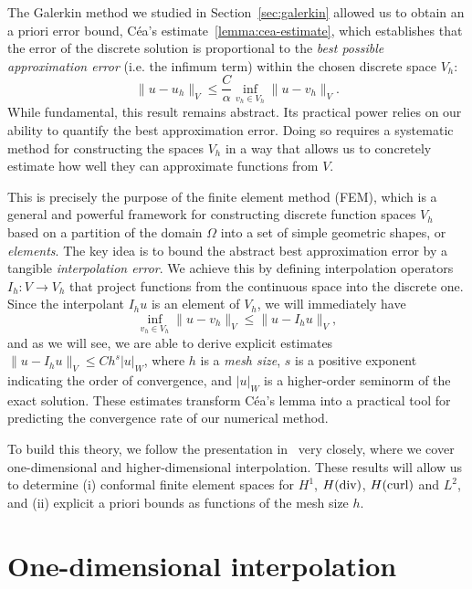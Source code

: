 The Galerkin method we studied in Section~\ref{sec:galerkin} allowed us to obtain an a priori error bound, Céa's estimate~\eqref{lemma:cea-estimate}, which establishes that the error of the discrete solution is proportional to the \emph{best possible approximation error} (i.e. the infimum term) within the chosen discrete space $V_h$:
\begin{equation}\label{eq:cea-estimate-fem}
    \|u-u_h\|_V \leq \frac{C}{\alpha} \inf_{v_h\in V_h} \| u - v_h\|_V.
\end{equation}
While fundamental, this result remains abstract. Its practical power relies on our ability to quantify the best approximation error. Doing so requires a systematic method for constructing the spaces $V_h$ in a way that allows us to concretely estimate how well they can approximate functions from $V$.

This is precisely the purpose of the finite element method (FEM), which is a general and powerful framework for constructing discrete function spaces $V_h$ based on a partition of the domain $\Omega$ into a set of simple geometric shapes, or \emph{elements}. The key idea is to bound the abstract best approximation error by a tangible \emph{interpolation error}. We achieve this by defining interpolation operators $I_h: V \to V_h$ that project functions from the continuous space into the discrete one. Since the interpolant $I_h u$ is an element of $V_h$, we will immediately have
\begin{equation}\label{eq:proj-error-fem}
    \inf_{v_h\in V_h} \| u - v_h\|_V \leq \| u - I_h u \|_V,
\end{equation}
and as we will see, we are able to derive explicit estimates $\| u - I_h u \|_V \leq C h^s |u|_{W}$, where $h$ is a \emph{mesh size}, $s$ is a positive exponent indicating the order of convergence, and $|u|_W$ is a higher-order seminorm of the exact solution. These estimates transform Céa's lemma into a practical tool for predicting the convergence rate of our numerical method.

To build this theory, we follow the presentation in~\cite[Chapter 1]{ern2004theory} very closely, where we cover one-dimensional and higher-dimensional interpolation. These results will allow us to determine (i) conformal finite element spaces for $H^1$, $H(\operatorname{\text{div}})$, $H(\operatorname{\text{curl}})$ and $L^2$, and (ii) explicit a priori bounds as functions of the mesh size $h$.

\section{One-dimensional interpolation}\label{sec:one-dimensional-interpolation}

